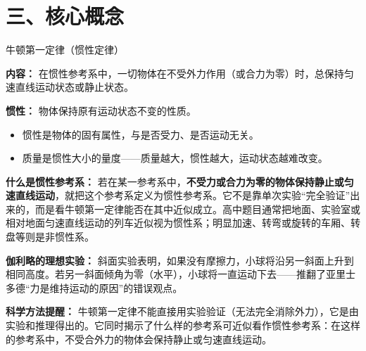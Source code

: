 \section*{三、核心概念}

\begin{conceptbox}{牛顿第一定律（惯性定律）}

\textbf{内容：} 在惯性参考系中，一切物体在不受外力作用（或合力为零）时，总保持匀速直线运动状态或静止状态。

\textbf{惯性：} 物体保持原有运动状态不变的性质。
\begin{itemize}
  \item 惯性是物体的固有属性，与是否受力、是否运动无关。
  \item 质量是惯性大小的量度——质量越大，惯性越大，运动状态越难改变。
\end{itemize}

\textbf{什么是惯性参考系：} 若在某一参考系中，\textbf{不受力或合力为零的物体保持静止或匀速直线运动}，就把这个参考系定义为惯性参考系。它不是靠单次实验“完全验证”出来的，而是看牛顿第一定律能否在其中近似成立。高中题目通常把地面、实验室或相对地面匀速直线运动的列车近似视为惯性系；明显加速、转弯或旋转的车厢、转盘等则是非惯性系。

\textbf{伽利略的理想实验：} 斜面实验表明，如果没有摩擦力，小球将沿另一斜面上升到相同高度。若另一斜面倾角为零（水平），小球将一直运动下去——推翻了亚里士多德“力是维持运动的原因”的错误观点。

\begin{center}


\label{fig:newton-first-ideal}
\end{center}

\textbf{科学方法提醒：} 牛顿第一定律不能直接用实验验证（无法完全消除外力），它是由实验和推理得出的。它同时揭示了什么样的参考系可近似看作惯性参考系：在这样的参考系中，不受合外力的物体会保持静止或匀速直线运动。

\end{conceptbox}

